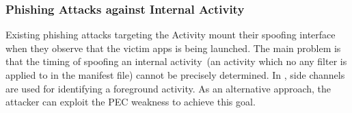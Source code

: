 





%
%

\subsubsection{Phishing Attacks against Internal Activity}

Existing phishing attacks targeting the Activity 
mount their spoofing interface when they observe
that the victim apps is being launched. 
The main problem is that the timing of spoofing an internal activity~(an activity which no any filter is applied to in the manifest file) 
cannot be precisely determined. 
In \cite{UI state}, side channels are used for identifying a foreground activity. 
As an alternative approach, the attacker can exploit the PEC weakness to achieve this goal. 

